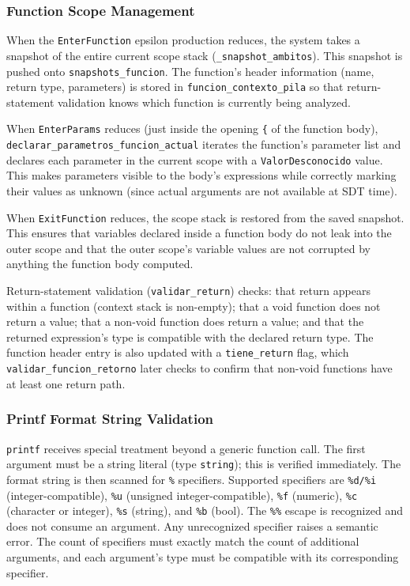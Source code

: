 \documentclass[letterpaper,12pt,oneside]{article}
\begin{document}
\subsubsection{Function Scope Management}
When the \texttt{EnterFunction} epsilon production reduces, the system takes a snapshot of the entire current scope stack (\texttt{\_snapshot\_ambitos}). This snapshot is pushed onto \texttt{snapshots\_funcion}. The function's header information (name, return type, parameters) is stored in \texttt{funcion\_contexto\_pila} so that return-statement validation knows which function is currently being analyzed.

When \texttt{EnterParams} reduces (just inside the opening \texttt{\{} of the function body), \texttt{declarar\_parametros\_funcion\_actual} iterates the function's parameter list and declares each parameter in the current scope with a \texttt{ValorDesconocido} value. This makes parameters visible to the body's expressions while correctly marking their values as unknown (since actual arguments are not available at SDT time).

When \texttt{ExitFunction} reduces, the scope stack is restored from the saved snapshot. This ensures that variables declared inside a function body do not leak into the outer scope and that the outer scope's variable values are not corrupted by anything the function body computed.

Return-statement validation (\texttt{validar\_return}) checks: that return appears within a function (context stack is non-empty); that a void function does not return a value; that a non-void function does return a value; and that the returned expression's type is compatible with the declared return type. The function header entry is also updated with a \texttt{tiene\_return} flag, which \texttt{validar\_funcion\_retorno} later checks to confirm that non-void functions have at least one return path.

\subsubsection{Printf Format String Validation}
\texttt{printf} receives special treatment beyond a generic function call. The first argument must be a string literal (type \texttt{string}); this is verified immediately. The format string is then scanned for \texttt{\%} specifiers. Supported specifiers are \texttt{\%d/\%i} (integer-compatible), \texttt{\%u} (unsigned integer-compatible), \texttt{\%f} (numeric), \texttt{\%c} (character or integer), \texttt{\%s} (string), and \texttt{\%b} (bool). The \texttt{\%\%} escape is recognized and does not consume an argument. Any unrecognized specifier raises a semantic error. The count of specifiers must exactly match the count of additional arguments, and each argument's type must be compatible with its corresponding specifier.
\end{document}
